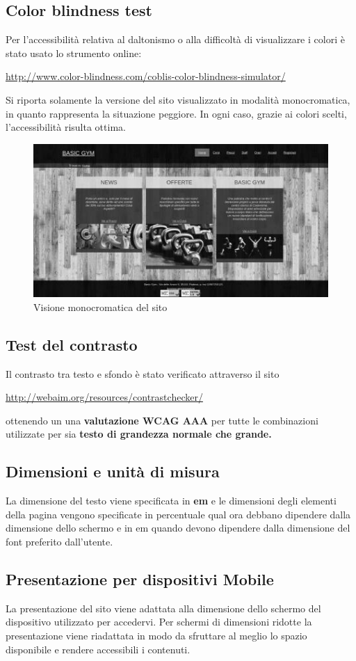 \documentclass[12pt,a4paper]{article}
\begin{document}
\subsection{Color blindness test}
Per l'accessibilità relativa al daltonismo o alla difficoltà di visualizzare i colori è stato usato lo strumento online: 	
\begin{center}
	\url{http://www.color-blindness.com/coblis-color-blindness-simulator/}
\end{center}
Si riporta solamente la versione del sito visualizzato in modalità monocromatica, in quanto rappresenta la situazione peggiore. 
In ogni caso, grazie ai colori scelti, l'accessibilità risulta ottima. 
\begin{figure}[h]
\centering
\includegraphics[width=0.6\linewidth]{img/colorblind/07}
\caption{Visione monocromatica del sito}
\label{fig:07}
\end{figure}


\subsection{Test del contrasto}
Il contrasto tra testo e sfondo è stato verificato attraverso il sito 
\begin{center}
	\url{http://webaim.org/resources/contrastchecker/}
\end{center}
ottenendo un una \textbf{valutazione WCAG AAA} per tutte le combinazioni utilizzate per sia \textbf{testo di grandezza normale che grande.}


\subsection{Dimensioni e unità di misura} La dimensione del testo viene specificata in \textbf{em} e le dimensioni degli elementi della pagina vengono specificate in percentuale qual ora debbano dipendere dalla dimensione dello schermo e in em quando devono dipendere dalla dimensione del font preferito dall'utente. 

\subsection{Presentazione per dispositivi Mobile}
La presentazione del sito viene adattata alla dimensione dello schermo del dispositivo utilizzato per accedervi. 
Per schermi di dimensioni ridotte la presentazione viene riadattata in modo da sfruttare al meglio lo spazio disponibile e rendere accessibili i contenuti. 
\end{document}
